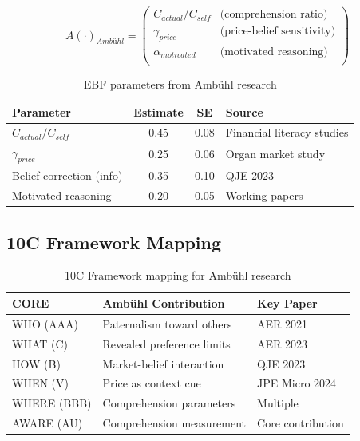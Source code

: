 \begin{equation}
A(\cdot)_{Ambühl} = \begin{pmatrix}
C_{actual} / C_{self} & \text{(comprehension ratio)} \\
\gamma_{price} & \text{(price-belief sensitivity)} \\
\alpha_{motivated} & \text{(motivated reasoning)} \\
\end{pmatrix}
\end{equation}

\begin{table}[h]
\centering
\begin{tabular}{lccl}
\hline
\textbf{Parameter} & \textbf{Estimate} & \textbf{SE} & \textbf{Source} \\
\hline
$C_{actual}/C_{self}$ & 0.45 & 0.08 & Financial literacy studies \\
$\gamma_{price}$ & 0.25 & 0.06 & Organ market study \\
Belief correction (info) & 0.35 & 0.10 & QJE 2023 \\
Motivated reasoning & 0.20 & 0.05 & Working papers \\
\hline
\end{tabular}
\caption{EBF parameters from Ambühl research}
\end{table}

\subsection{10C Framework Mapping}

\begin{table}[h]
\centering
\begin{tabular}{lll}
\hline
\textbf{CORE} & \textbf{Ambühl Contribution} & \textbf{Key Paper} \\
\hline
WHO (AAA) & Paternalism toward others & AER 2021 \\
WHAT (C) & Revealed preference limits & AER 2023 \\
HOW (B) & Market-belief interaction & QJE 2023 \\
WHEN (V) & Price as context cue & JPE Micro 2024 \\
WHERE (BBB) & Comprehension parameters & Multiple \\
AWARE (AU) & Comprehension measurement & Core contribution \\
\hline
\end{tabular}
\caption{10C Framework mapping for Ambühl research}
\end{table}

